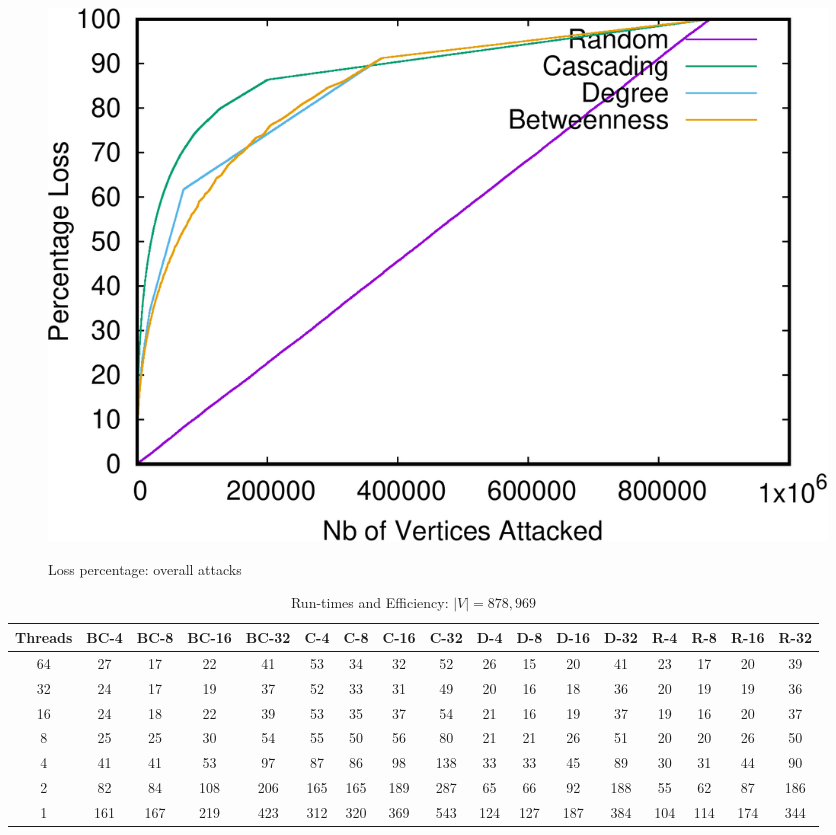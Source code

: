 \begin{figure}
\centering
\includegraphics[scale=0.35]{bench/loss-all-crop.pdf}
\label{fig:loss-all}
\caption{Loss percentage: overall attacks}
\end{figure}


\begin{table}[t]
\begin{minipage}[b]{\textwidth}
\label{tab:graph1}
\caption{Run-times and Efficiency: $\left \vert V \right \vert = 878,969$}
{\small
\centering
\begin{tabular}{||c||c|c|c|c||c|c|c|c||c|c|c|c||c|c|c|c|}
\hline
\textbf{Threads}	&\cellcolor{black!10}BC-4&	\cellcolor{black!10}BC-8	&\cellcolor{black!10}BC-16	&\cellcolor{black!10}BC-32&	\cellcolor{black!10}C-4	&\cellcolor{black!10}C-8&	\cellcolor{black!10}C-16&	\cellcolor{black!10}C-32&	\cellcolor{black!10}D-4&	\cellcolor{black!10}D-8	&\cellcolor{black!10}D-16&\cellcolor{black!10}	D-32&	\cellcolor{black!10}R-4	&\cellcolor{black!10}R-8&	\cellcolor{black!10}R-16&	\cellcolor{black!10}R-32 \\ \hline \hline
64&		27	&17	&22	&41	&53	&34	&32	&52	&26	&15	&20	&41	&23	&17	&20	&39			\\ \hline					
32&		24	&17	&19	&37	&52	&33	&31	&49	&20	&16	&18	&36	&20	&19	&19	&36	\\ \hline
16&		24	&18	&22	&39	&53	&35	&37	&54	&21	&16	&19	&37	&19	&16	&20&37	\\ \hline
8	&	25	&25	&30	&54	&55	&50	&56	&80	&21	&21	&26	&51	&20	&20	&26	&50	\\ \hline
4	&	41	&41	&53	&97	&87	&86	&98	&138	&33	&33	&45	&89	&30	&31	&44	&90	\\ \hline
2&		82	&84	&108	&206	&165	&165	&189	&287	&65	&66	&92	&188	&55	&62	&87	&186	\\ \hline
1&		161	&167	&219	&423	&312	&320	&369	&543	&124	&127	&187	&384	&104	&114	&174	&344	\\ \hline
\end{tabular}
}
\end{minipage}
\end{table}


